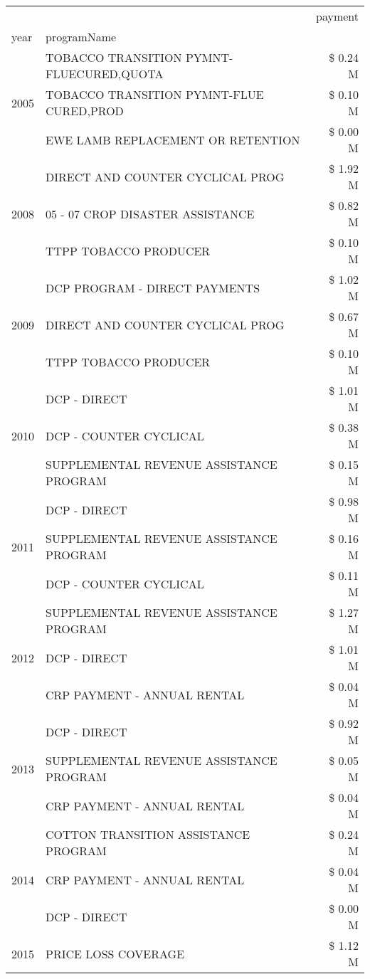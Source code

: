 \begin{tabular}{llr}
\toprule
 &  & payment \\
year & programName &  \\
\midrule
\multirow[t]{3}{*}{2005} & TOBACCO TRANSITION PYMNT-FLUECURED,QUOTA & \$ 0.24 M \\
 & TOBACCO TRANSITION PYMNT-FLUE CURED,PROD & \$ 0.10 M \\
 & EWE LAMB REPLACEMENT OR RETENTION & \$ 0.00 M \\
\cline{1-3}
\multirow[t]{3}{*}{2008} & DIRECT AND COUNTER CYCLICAL PROG & \$ 1.92 M \\
 & 05 - 07 CROP DISASTER ASSISTANCE & \$ 0.82 M \\
 & TTPP TOBACCO PRODUCER & \$ 0.10 M \\
\cline{1-3}
\multirow[t]{3}{*}{2009} & DCP PROGRAM - DIRECT PAYMENTS & \$ 1.02 M \\
 & DIRECT AND COUNTER CYCLICAL PROG & \$ 0.67 M \\
 & TTPP TOBACCO PRODUCER & \$ 0.10 M \\
\cline{1-3}
\multirow[t]{3}{*}{2010} & DCP - DIRECT & \$ 1.01 M \\
 & DCP - COUNTER CYCLICAL & \$ 0.38 M \\
 & SUPPLEMENTAL REVENUE ASSISTANCE PROGRAM & \$ 0.15 M \\
\cline{1-3}
\multirow[t]{3}{*}{2011} & DCP - DIRECT & \$ 0.98 M \\
 & SUPPLEMENTAL REVENUE ASSISTANCE PROGRAM & \$ 0.16 M \\
 & DCP - COUNTER CYCLICAL & \$ 0.11 M \\
\cline{1-3}
\multirow[t]{3}{*}{2012} & SUPPLEMENTAL REVENUE ASSISTANCE PROGRAM & \$ 1.27 M \\
 & DCP - DIRECT & \$ 1.01 M \\
 & CRP PAYMENT - ANNUAL RENTAL & \$ 0.04 M \\
\cline{1-3}
\multirow[t]{3}{*}{2013} & DCP - DIRECT & \$ 0.92 M \\
 & SUPPLEMENTAL REVENUE ASSISTANCE PROGRAM & \$ 0.05 M \\
 & CRP PAYMENT - ANNUAL RENTAL & \$ 0.04 M \\
\cline{1-3}
\multirow[t]{3}{*}{2014} & COTTON TRANSITION ASSISTANCE PROGRAM & \$ 0.24 M \\
 & CRP PAYMENT - ANNUAL RENTAL & \$ 0.04 M \\
 & DCP - DIRECT & \$ 0.00 M \\
\cline{1-3}
\multirow[t]{3}{*}{2015} & PRICE LOSS COVERAGE & \$ 1.12 M \\

\end{tabular}
